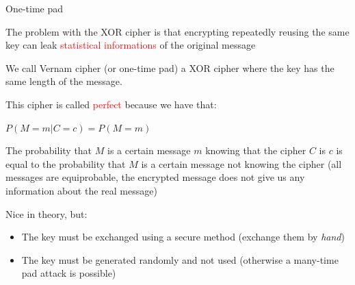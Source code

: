 \begin{frame}{One-time pad}

  \pause

  The problem with the XOR cipher is that encrypting repeatedly reusing the same key can leak \textcolor{red}{statistical informations} of the original message  
  
  \medskip
  
  We call Vernam cipher (or one-time pad) a XOR cipher where the key has the same length of the message. 
  
  \smallskip
  
  This cipher is called \textcolor{red}{perfect} because we have that:
  
  \medskip
  
  \phantom{pad}$P(M = m | C = c) = P(M = m)$
  
  \medskip
  
  The probability that $M$ is a certain message $m$ knowing that the cipher $C$ is $c$ is equal to the probability that $M$ is a certain message not knowing the cipher (all messages are equiprobable, the encrypted message does not give us any information about the real message)
  
  \medskip
  
  \pause

  Nice in theory, but:
  
  \begin{itemize}
    \item The key must be exchanged using a secure method (exchange them by \textit{hand})
    \item The key must be generated randomly and not used (otherwise a many-time pad attack is possible)
  \end{itemize}

\end{frame}

